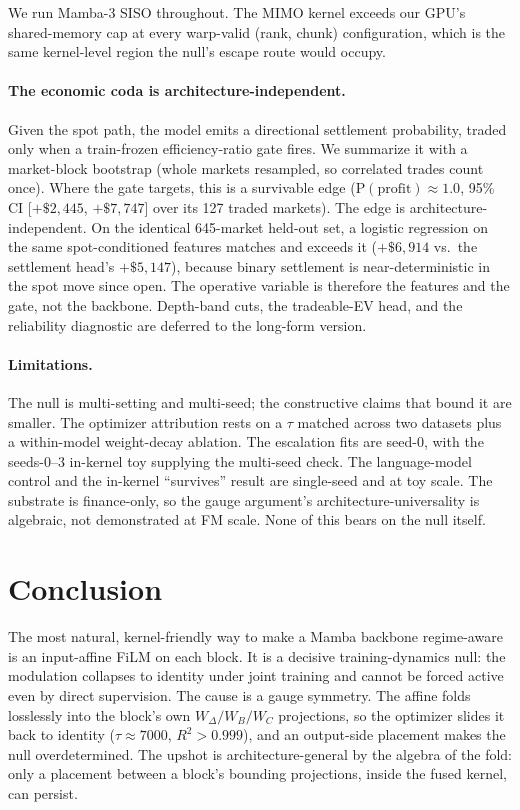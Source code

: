 \documentclass{article}
\begin{document}
We run Mamba-3 SISO throughout. The MIMO kernel exceeds our GPU's shared-memory cap at every warp-valid (rank, chunk) configuration, which is the same kernel-level region the null's escape route would occupy.

\paragraph{The economic coda is architecture-independent.} Given the spot path, the model emits a directional settlement probability, traded only when a train-frozen efficiency-ratio gate fires. We summarize it with a market-block bootstrap (whole markets resampled, so correlated trades count once). Where the gate targets, this is a survivable edge ($\mathrm{P(profit)}\approx1.0$, 95\% CI [$+\$2{,}445$, $+\$7{,}747$] over its 127 traded markets). The edge is architecture-independent. On the identical 645-market held-out set, a logistic regression on the same spot-conditioned features matches and exceeds it ($+\$6{,}914$ vs.\ the settlement head's $+\$5{,}147$), because binary settlement is near-deterministic in the spot move since open. The operative variable is therefore the features and the gate, not the backbone. Depth-band cuts, the tradeable-EV head, and the reliability diagnostic are deferred to the long-form version.

\paragraph{Limitations.} The null is multi-setting and multi-seed; the constructive claims that bound it are smaller. The optimizer attribution rests on a $\tau$ matched across two datasets plus a within-model weight-decay ablation. The escalation fits are seed-0, with the seeds-0--3 in-kernel toy supplying the multi-seed check. The language-model control and the in-kernel ``survives'' result are single-seed and at toy scale. The substrate is finance-only, so the gauge argument's architecture-universality is algebraic, not demonstrated at FM scale. None of this bears on the null itself.

\section{Conclusion}
The most natural, kernel-friendly way to make a Mamba backbone regime-aware is an input-affine FiLM on each block. It is a decisive training-dynamics null: the modulation collapses to identity under joint training and cannot be forced active even by direct supervision. The cause is a gauge symmetry. The affine folds losslessly into the block's own $W_\Delta/W_B/W_C$ projections, so the optimizer slides it back to identity ($\tau\approx7000$, $R^2>0.999$), and an output-side placement makes the null overdetermined. The upshot is architecture-general by the algebra of the fold: only a placement between a block's bounding projections, inside the fused kernel, can persist.
\end{document}
